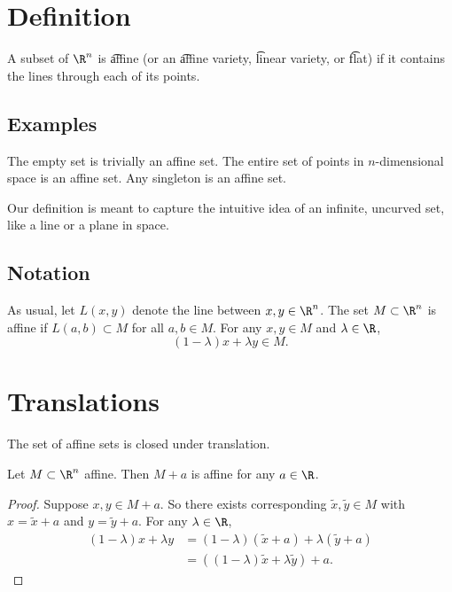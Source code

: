 
\section*{Definition}

A subset of $\R ^n$ is \t{affine} (or an \t{affine variety}, \t{linear variety}, or \t{flat}) if it contains the lines through each of its points.

\subsection*{Examples}

The empty set is trivially an affine set.
The entire set of points in $n$-dimensional space is an affine set.
Any singleton is an affine set.

Our definition is meant to capture the intuitive idea of an infinite, uncurved set, like a line or a plane in space.

\subsection*{Notation}

As usual, let $L(x, y)$ denote the line between $x, y \in \R ^n$.
The set $M \subset \R ^n$ is affine if $L(a, b) \subset M$ for all $a, b \in M$.
For any $x, y \in M$ and $\lambda  \in \R $,
  \[
(1-\lambda )x + \lambda y \in M.
  \]

\section*{Translations}

The set of affine sets is closed under translation.
\begin{proposition}
Let $M \subset \R ^n$ affine.
Then $M + a$ is affine for any $a \in \R $.
\begin{proof}
Suppose $x, y \in M+a$. So there exists corresponding $\tilde{x}, \tilde{y} \in M$ with $x = \tilde{x} + a$ and $y = \tilde{y} + a$.
For any $\lambda  \in \R $,
  \[
\begin{aligned}
(1-\lambda )x + \lambda y & = (1-\lambda )(\tilde{x} + a) + \lambda (\tilde{y} + a) \\
&= ((1-\lambda )\tilde{x} + \lambda \tilde{y}) + a.
\end{aligned}
  \]
\end{proof}
\end{proposition}

